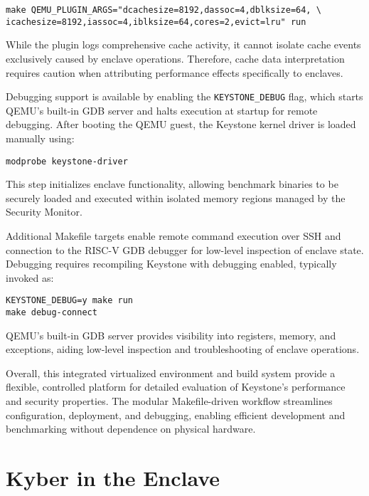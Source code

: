 \begin{verbatim}
make QEMU_PLUGIN_ARGS="dcachesize=8192,dassoc=4,dblksize=64, \
icachesize=8192,iassoc=4,iblksize=64,cores=2,evict=lru" run
\end{verbatim}

While the plugin logs comprehensive cache activity, it cannot isolate cache events exclusively caused by enclave operations. Therefore, cache data interpretation requires caution when attributing performance effects specifically to enclaves.

Debugging support is available by enabling the \texttt{KEYSTONE\_DEBUG} flag, which starts QEMU’s built-in GDB server and halts execution at startup for remote debugging. After booting the QEMU guest, the Keystone kernel driver is loaded manually using:

\begin{verbatim}
modprobe keystone-driver
\end{verbatim}

This step initializes enclave functionality, allowing benchmark binaries to be securely loaded and executed within isolated memory regions managed by the Security Monitor.

Additional Makefile targets enable remote command execution over SSH and connection to the RISC-V GDB debugger for low-level inspection of enclave state. Debugging requires recompiling Keystone with debugging enabled, typically invoked as:

\begin{verbatim}
KEYSTONE_DEBUG=y make run
make debug-connect
\end{verbatim}

QEMU’s built-in GDB server provides visibility into registers, memory, and exceptions, aiding low-level inspection and troubleshooting of enclave operations.

Overall, this integrated virtualized environment and build system provide a flexible, controlled platform for detailed evaluation of Keystone’s performance and security properties. The modular Makefile-driven workflow streamlines configuration, deployment, and debugging, enabling efficient development and benchmarking without dependence on physical hardware. %

\section{Kyber in the Enclave}
\label{sec:kyber-enclave}

